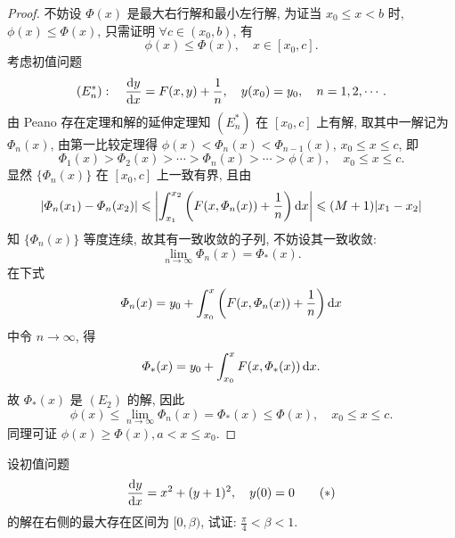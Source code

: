 \begin{proof}
  不妨设 $\varPhi(x)$ 是最大右行解和最小左行解, 为证当 $x_0\leq x<b$ 时, 
  $\phi(x)\leq\varPhi(x)$, 只需证明 $\forall c\in(x_0,b)$, 有
  \[\phi(x)\leq\varPhi(x),\quad x\in[x_0,c].\]
  考虑初值问题
  \[(E_n^*):\quad \frac{\mathop{}\!\mathrm{d} y}{\mathop{}\!\mathrm{d} x}=F(x,y)+\frac{1}{n},
    \quad y(x_0)=y_0,\quad n=1,2,\cdots.\]
  由 Peano 存在定理和解的延伸定理知 $(E_n^*)$ 在 $[x_0,c]$ 上有解, 取其中一解记为 $\varPhi_n(x)$, 
  由第一比较定理得 $\phi(x)<\varPhi_n(x)<\varPhi_{n-1}(x)$, $x_0\leq x\leq c$, 即
  \[\varPhi_1(x)>\varPhi_2(x)>\cdots>\varPhi_n(x)>\cdots>\phi(x),\quad x_0\leq x\leq c.\]
  显然 $\{\varPhi_n(x)\}$ 在 $[x_0,c]$ 上一致有界, 且由
  \[|\varPhi_n(x_1)-\varPhi_n(x_2)|\leqslant
    \left|\int_{x_1}^{x_2}\left(F(x,\varPhi_n(x))+\frac{1}{n}\right)\mathop{}\!\mathrm{d} x\right|\leqslant(M+1)|x_1-x_2|\]
  知 $\{\varPhi_n(x)\}$ 等度连续, 故其有一致收敛的子列, 不妨设其一致收敛:
  \[\lim_{n\to\infty}\varPhi_n(x)=\varPhi_*(x).\]
  在下式
  \[\varPhi_n(x)=y_0+\int_{x_0}^x\left(F(x,\varPhi_n(x))+\frac{1}{n}\right)\mathop{}\!\mathrm{d} x\]
  中令 $n\to\infty$, 得
  \[\varPhi_*(x)=y_0+\int_{x_0}^xF(x,\varPhi_*(x))\mathop{}\!\mathrm{d} x.\]
  故 $\varPhi_*(x)$ 是 $(E_2)$ 的解, 因此
  \[\phi(x)\leq\lim_{n\to\infty}\varPhi_n(x)=\varPhi_*(x)\leq\varPhi(x),\quad x_0\leq x\leq c.\]
  同理可证 $\phi(x)\geq\varPhi(x),a<x\leq x_0$.
\end{proof}



\begin{exercise}
  设初值问题
  \begin{equation}
    \frac{\mathop{}\!\mathrm{d} y}{\mathop{}\!\mathrm{d} x}=x^2+(y+1)^2,\quad y(0)=0 \tag{$*$}
  \end{equation}
  的解在右侧的最大存在区间为 $[0,\beta)$, 试证: $\frac{\pi}{4}<\beta<1$.
\end{exercise}

